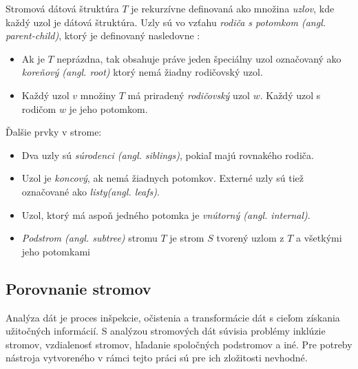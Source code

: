 Stromová dátová štruktúra \(T\) je rekurzívne definovaná ako množina \textit{uzlov}, kde každý uzol je dátová štruktúra. Uzly sú vo vzťahu \textit{rodiča s potomkom (angl. parent-child)}, ktorý je definovaný nasledovne \cite{Dsaj}:
\begin{itemize}
	\item{Ak je \(T\) neprázdna, tak obsahuje práve jeden špeciálny uzol označovaný ako \textit{koreňový (angl. root)} ktorý nemá žiadny rodičovský uzol.
	}
	\item{Každý uzol \(v\) množiny \(T\) má priradený \textit{rodičovský} uzol \(w\). Každý uzol s rodičom \(w\) je jeho potomkom.
	}	
\end{itemize}
Ďalšie prvky v strome:
\begin{itemize}
	\item{Dva uzly sú \textit{súrodenci (angl. siblings)}, pokiaľ majú rovnakého rodiča.
	}
	\item{Uzol je \textit{koncový}, ak nemá žiadnych potomkov. Externé uzly sú tiež označované ako \textit{listy(angl. leafs)}. 
	}
	\item{Uzol, ktorý má aspoň jedného potomka je \textit{vnútorný (angl. internal)}.
	}	
	\item{\textit{Podstrom (angl. subtree)} stromu \(T\) je strom \(S\) tvorený uzlom z \(T\) a všetkými jeho potomkami
	}		
\end{itemize} 
\subsection*{Porovnanie stromov}
Analýza dát je proces inšpekcie, očistenia a transformácie dát s cieľom získania užitočných informácií. S analýzou stromových dát súvisia problémy inklúzie stromov, vzdialenosť stromov, hľadanie spoločných podstromov a iné. Pre potreby nástroja vytvoreného v rámci tejto práci sú pre ich zložitosti nevhodné.

